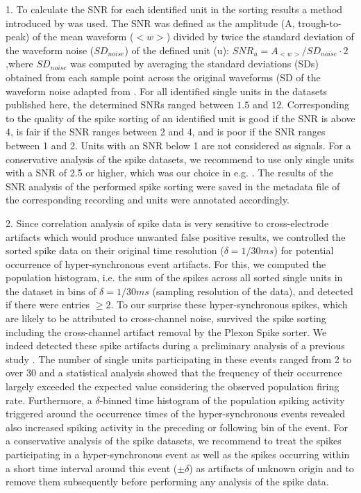 1. To calculate the SNR for each identified unit in the sorting results a method introduced by \citet{Hatsopoulos_2004} was used. The SNR was defined as the amplitude (A, trough-to-peak) of the mean waveform ($<w>$) divided by twice the standard deviation of the waveform noise ($SD_{noise}$) of the defined unit (u): $SNR_{u}=A_{<w>}/SD_{noise}\cdot2$,where $SD_{noise}$ was computed by averaging the standard deviations (SDs) obtained from each sample point across the original waveforms (SD of the waveform noise adapted from \citet{Nordhausen_1996,  Suner_2005}. For all identified single units in the datasets published here, the determined SNRs ranged between $1.5$ and $12$. Corresponding to \citet{Suner_2005} the quality of the spike sorting of an identified unit is good if the SNR is above 4, is fair if the SNR ranges between 2 and 4, and is poor if the SNR ranges between 1 and 2. Units with an SNR below 1 are not considered as signals. For a conservative analysis of the spike datasets, we recommend to use only single units with a SNR of 2.5 or higher, which was our choice in e.g. \citet{Torre_2016}. The results of the SNR analysis of the performed spike sorting were saved in the  metadata file of the corresponding recording and units were annotated accordingly. 

2. Since correlation analysis of spike data is very sensitive to cross-electrode artifacts which would produce unwanted false positive results, we controlled the sorted spike data on their original time resolution ($\delta=1/30ms$) for potential occurrence of hyper-synchronous event artifacts. For this, we computed the population histogram, i.e. the sum of the spikes across all sorted single units in the dataset in bins of $\delta=1/30ms$ (sampling resolution of the data), and detected if there were entries $\ge2$. To our surprise these hyper-synchronous spikes, which are likely to be attributed to cross-channel noise, survived the spike sorting including the cross-channel artifact removal by the Plexon Spike sorter. We indeed detected these spike artifacts during a preliminary analysis of a previous study \citep{Torre_2016}. The number of single units participating in these events ranged from 2 to over 30 and a statistical analysis showed that the frequency of their occurrence largely exceeded the expected value considering the observed population firing rate. Furthermore, a $\delta$-binned time histogram of the population spiking activity triggered around the occurrence times of the hyper-synchronous events revealed also increased spiking activity in the preceding or following bin of the event. For a conservative analysis of the spike datasets, we recommend to treat the spikes participating in a hyper-synchronous event as well as the spikes occurring within a short time interval around this event ($\scriptstyle \pm\delta$) as artifacts of unknown origin and to remove them subsequently before performing any analysis of the spike data.

